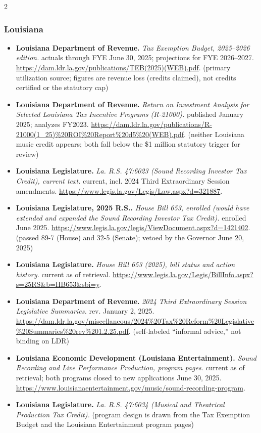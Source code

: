 {\begin{multicols}{2}
\subsubsection*{Louisiana}
\begin{itemize}[itemsep=0pt,topsep=1pt,parsep=0pt,partopsep=0pt,leftmargin=1em]
\item \textbf{Louisiana Department of Revenue.} \textit{Tax Exemption Budget, 2025--2026 edition.} actuals through FYE June 30, 2025; projections for FYE 2026--2027. \url{https://dam.ldr.la.gov/publications/TEB(2025)(WEB).pdf}. {\color{ammuted}(primary utilization source; figures are revenue loss (credits claimed), not credits certified or the statutory cap)}
\item \textbf{Louisiana Department of Revenue.} \textit{Return on Investment Analysis for Selected Louisiana Tax Incentive Programs (R-21000).} published January 2025; analyzes FY2023. \url{https://dam.ldr.la.gov/publications/R-21000(1_25)%20ROI%20Report%20d5%20(WEB).pdf}. {\color{ammuted}(neither Louisiana music credit appears; both fall below the \$1 million statutory trigger for review)}
\item \textbf{Louisiana Legislature.} \textit{La. R.S. 47:6023 (Sound Recording Investor Tax Credit), current text.} current, incl. 2024 Third Extraordinary Session amendments. \url{https://www.legis.la.gov/Legis/Law.aspx?d=321887}.
\item \textbf{Louisiana Legislature, 2025 R.S..} \textit{House Bill 653, enrolled (would have extended and expanded the Sound Recording Investor Tax Credit).} enrolled June 2025. \url{https://www.legis.la.gov/legis/ViewDocument.aspx?d=1421402}. {\color{ammuted}(passed 89-7 (House) and 32-5 (Senate); vetoed by the Governor June 20, 2025)}
\item \textbf{Louisiana Legislature.} \textit{House Bill 653 (2025), bill status and action history.} current as of retrieval. \url{https://www.legis.la.gov/Legis/BillInfo.aspx?s=25RS&b=HB653&sbi=y}.
\item \textbf{Louisiana Department of Revenue.} \textit{2024 Third Extraordinary Session Legislative Summaries.} rev. January 2, 2025. \url{https://dam.ldr.la.gov/miscellaneous/2024%20Tax%20Reform%20Legislative%20Summaries%20rev%201.2.25.pdf}. {\color{ammuted}(self-labeled “informal advice,” not binding on LDR)}
\item \textbf{Louisiana Economic Development (Louisiana Entertainment).} \textit{Sound Recording and Live Performance Production, program pages.} current as of retrieval; both programs closed to new applications June 30, 2025. \url{https://www.louisianaentertainment.gov/music/sound-recording-program}.
\item \textbf{Louisiana Legislature.} \textit{La. R.S. 47:6034 (Musical and Theatrical Production Tax Credit).} {\color{ammuted}(program design is drawn from the Tax Exemption Budget and the Louisiana Entertainment program pages)}
\end{itemize}

\end{multicols}}

